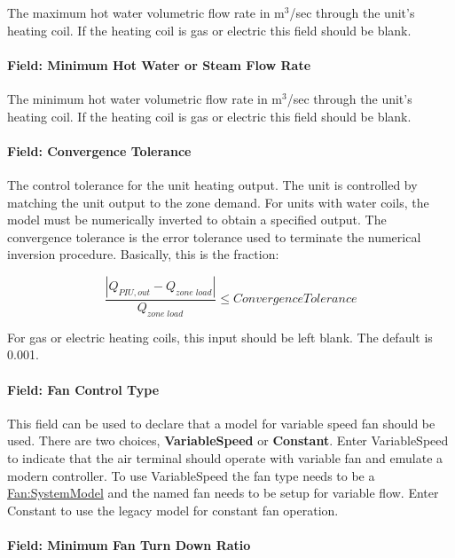 The maximum hot water volumetric flow rate in m\(^{3}\)/sec through the unit's heating coil. If the heating coil is gas or electric this field should be blank.

\paragraph{Field: Minimum Hot Water or Steam Flow Rate}\label{field-minimum-hot-water-or-steam-flow-rate-4}

The minimum hot water volumetric flow rate in m\(^{3}\)/sec through the unit's heating coil. If the heating coil is gas or electric this field should be blank.

\paragraph{Field: Convergence Tolerance}\label{field-convergence-tolerance-3}

The control tolerance for the unit heating output. The unit is controlled by matching the unit output to the zone demand. For units with water coils, the model must be numerically inverted to obtain a specified output. The convergence tolerance is the error tolerance used to terminate the numerical inversion procedure. Basically, this is the fraction:

\begin{equation}
\frac{{\left| {{Q_{PIU,out}} - {Q_{zone\;load}}} \right|}}{{{Q_{zone\;load}}}} \le ConvergenceTolerance
\end{equation}

For gas or electric heating coils, this input should be left blank. The default is 0.001.

\paragraph{Field: Fan Control Type}\label{field-fan-control-type-seriesPIU}

This field can be used to declare that a model for variable speed fan should be used. There are two choices, \textbf{VariableSpeed} or \textbf{Constant}.  Enter VariableSpeed to indicate that the air terminal should operate with variable fan and emulate a modern controller. To use VariableSpeed the fan type needs to be a \hyperref[fansystemmodel]{Fan:SystemModel} and the named fan needs to be setup for variable flow. Enter Constant to use the legacy model for constant fan operation.

\paragraph{Field: Minimum Fan Turn Down Ratio}\label{field-fan-turn-down-ratio-seriesPIU}

